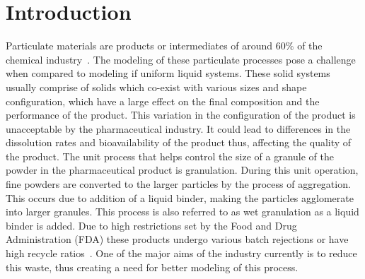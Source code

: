 \documentclass[fleqn,twoside,10pt]{article}
\begin{document}
\section{Introduction}
Particulate materials are products or intermediates of around $60\%$ of the 
chemical industry~\citep{ingram2005}.
The modeling of these particulate processes pose a challenge when compared to 
modeling if uniform liquid
systems. These solid systems usually comprise of solids which co-exist with various sizes and shape configuration,
which have a large effect on the final composition and the performance of the product. This variation in the 
configuration of the product is unacceptable by the pharmaceutical industry. It 
could lead to differences in the 
dissolution rates and bioavailability of the product thus, affecting the quality of the product. The unit process 
that helps control the size of a granule of the powder in the pharmaceutical product is granulation. During this 
unit operation, fine powders are converted to the  larger particles by the process of aggregation. This occurs
due to addition of a liquid binder, making the particles agglomerate into larger granules. This process is also 
referred to as wet granulation as a liquid binder is added. Due to high restrictions set by the Food and Drug 
Administration (FDA) these products undergo various batch rejections or have 
high recycle ratios~\citep{sen2014}. 
One of the major aims of the industry currently is to reduce this waste, thus creating a need for better 
modeling of this process.
\end{document}
